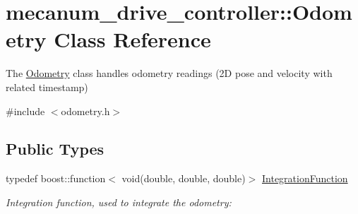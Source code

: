 \hypertarget{classmecanum__drive__controller_1_1Odometry}{}\section{mecanum\+\_\+drive\+\_\+controller\+:\+:Odometry Class Reference}
\label{classmecanum__drive__controller_1_1Odometry}


The \hyperlink{classmecanum__drive__controller_1_1Odometry}{Odometry} class handles odometry readings (2D pose and velocity with related timestamp)  




{\ttfamily \#include $<$odometry.\+h$>$}

\subsection*{Public Types}
\begin{DoxyCompactItemize}
\item 
\mbox{\label{classmecanum__drive__controller_1_1Odometry_a0a4b9e35c3b14456cceb2e02db6a895a}} 
typedef boost\+::function$<$ void(double, double, double)$>$ \hyperlink{classmecanum__drive__controller_1_1Odometry_a0a4b9e35c3b14456cceb2e02db6a895a}{Integration\+Function}
\begin{DoxyCompactList}\small\item\em Integration function, used to integrate the odometry\+: \end{DoxyCompactList}\end{DoxyCompactItemize}
